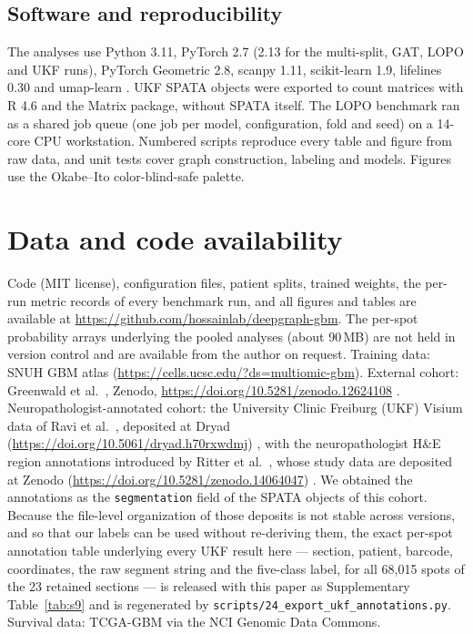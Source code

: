 \documentclass[11pt,letterpaper]{article}
\begin{document}
\subsection{Software and reproducibility}

The analyses use Python 3.11, PyTorch 2.7 (2.13 for the multi-split, GAT, LOPO and UKF runs), PyTorch Geometric 2.8, scanpy 1.11, scikit-learn 1.9, lifelines 0.30 and umap-learn \cite{mcinnes2018}. UKF SPATA objects were exported to count matrices with R 4.6 and the Matrix package, without SPATA itself. The LOPO benchmark ran as a shared job queue (one job per model, configuration, fold and seed) on a 14-core CPU workstation. Numbered scripts reproduce every table and figure from raw data, and unit tests cover graph construction, labeling and models. Figures use the Okabe--Ito color-blind-safe palette.

\section*{Data and code availability}
Code (MIT license), configuration files, patient splits, trained weights, the per-run metric records of every benchmark run, and all figures and tables are available at \url{https://github.com/hossainlab/deepgraph-gbm}. The per-spot probability arrays underlying the pooled analyses (about 90\,MB) are not held in version control and are available from the author on request. Training data: SNUH GBM atlas \cite{park2026} (\url{https://cells.ucsc.edu/?ds=multiomic-gbm}). External cohort: Greenwald et al.\ \cite{greenwald2024}, Zenodo, \url{https://doi.org/10.5281/zenodo.12624108} \cite{greenwald2024data}. Neuropathologist-annotated cohort: the University Clinic Freiburg (UKF) Visium data of Ravi et al.\ \cite{ravi2022}, deposited at Dryad (\url{https://doi.org/10.5061/dryad.h70rxwdmj}) \cite{ravi2022data}, with the neuropathologist H\&E region annotations introduced by Ritter et al.\ \cite{ritter2025}, whose study data are deposited at Zenodo (\url{https://doi.org/10.5281/zenodo.14064047}) \cite{heiland2024data}. We obtained the annotations as the \texttt{segmentation} field of the SPATA objects of this cohort. Because the file-level organization of those deposits is not stable across versions, and so that our labels can be used without re-deriving them, the exact per-spot annotation table underlying every UKF result here --- section, patient, barcode, coordinates, the raw segment string and the five-class label, for all 68{,}015 spots of the 23 retained sections --- is released with this paper as Supplementary Table~\ref{tab:s9} and is regenerated by \texttt{scripts/24\_export\_ukf\_annotations.py}. Survival data: TCGA-GBM via the NCI Genomic Data Commons.
\end{document}
